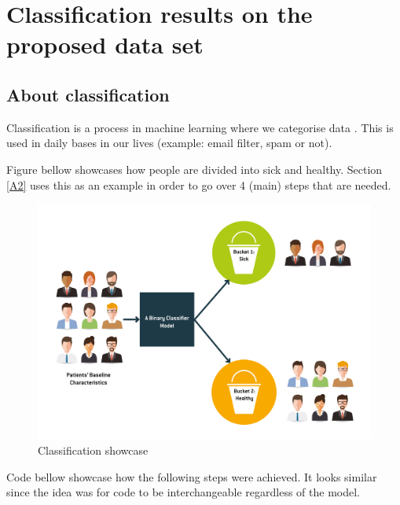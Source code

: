 \section{Classification results on the proposed data set}\label{Classification}
\subsection{About classification}

Classification is a process in machine learning where we categorise data \parencite{kotsiantis2006machine}. This is used in daily bases in our lives (example: email filter, spam or not).

Figure bellow showcases how people are divided into sick and healthy. Section \ref{A2} uses this as an example in order to go over 4 (main) steps that are needed.

\begin{figure}[H]
    \includegraphics[scale=0.13]{img/Classification/Binary-Classifier-Model.png}
    \centering
    \caption{Classification showcase \parencite{web:S-cubed}}
    \label{fig:classification}
\end{figure}

Code bellow showcase how the following steps were achieved. It looks similar since the idea was for code to be interchangeable regardless of the model.

